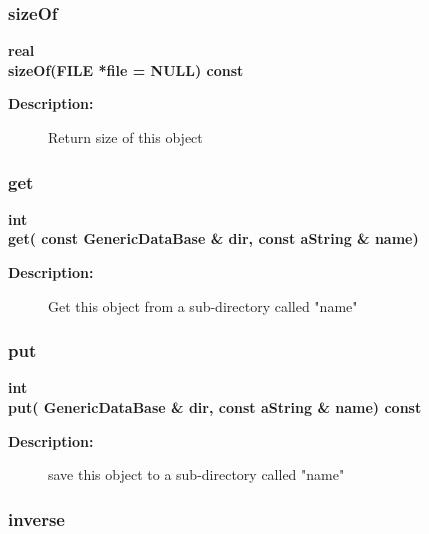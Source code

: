 \subsubsection{sizeOf}
 
\begin{flushleft} \textbf{%
real  \\ 
\settowidth{\ApproximateGlobalInverseIncludeArgIndent}{sizeOf(}%
sizeOf(FILE *file  = NULL) const
}\end{flushleft}
\begin{description}
\item[{\bf Description:}] 
   Return size of this object  
\end{description}
\subsubsection{get}
 
\begin{flushleft} \textbf{%
int  \\ 
\settowidth{\ApproximateGlobalInverseIncludeArgIndent}{get(}%
get( const GenericDataBase \& dir, const aString \& name)
}\end{flushleft}
\begin{description}
\item[{\bf Description:}] 
    Get this object from a sub-directory called "name"
\end{description}
\subsubsection{put}
 
\begin{flushleft} \textbf{%
int   \\ 
\settowidth{\ApproximateGlobalInverseIncludeArgIndent}{put(}%
put( GenericDataBase \& dir, const aString \& name) const
}\end{flushleft}
\begin{description}
\item[{\bf Description:}] 
 save this object to a sub-directory called "name"
\end{description}
\subsubsection{inverse}
 
